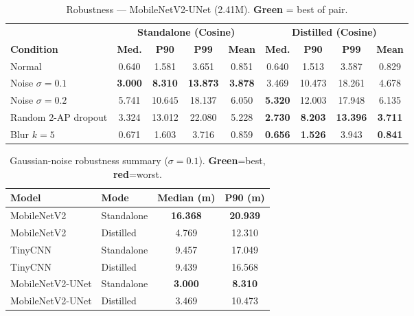 \documentclass[11pt]{article}
\newcommand{\best}[1]{\textbf{\textcolor{green!50!black}{#1}}}
\newcommand{\worst}[1]{\textbf{\textcolor{red!70!black}{#1}}}
\begin{document}
\begin{table}[h]\centering\footnotesize
\caption{Robustness --- MobileNetV2-UNet (2.41M). \best{Green} = best of pair.}
\begin{tabular}{@{}lcccc|cccc@{}}
\toprule
 & \multicolumn{4}{c|}{\textbf{Standalone (Cosine)}} & \multicolumn{4}{c}{\textbf{Distilled (Cosine)}} \\
\textbf{Condition} & \textbf{Med.} & \textbf{P90} & \textbf{P99} & \textbf{Mean} & \textbf{Med.} & \textbf{P90} & \textbf{P99} & \textbf{Mean} \\
\midrule
Normal               & 0.640 & 1.581 & 3.651 & 0.851 & 0.640 & 1.513 & 3.587 & 0.829 \\
Noise $\sigma{=}0.1$ & \best{3.000}& \best{8.310}& \best{13.873}& \best{3.878}& 3.469 & 10.473& 18.261& 4.678 \\
Noise $\sigma{=}0.2$ & 5.741 & 10.645& 18.137& 6.050 & \best{5.320}& 12.003& 17.948& 6.135 \\
Random 2-AP dropout  & 3.324 & 13.012& 22.080& 5.228 & \best{2.730}& \best{8.203}& \best{13.396}& \best{3.711} \\
Blur $k{=}5$         & 0.671 & 1.603 & 3.716 & 0.859 & \best{0.656}& \best{1.526}& 3.943 & \best{0.841} \\
\bottomrule
\end{tabular}
\end{table}

\begin{table}[h]\centering\footnotesize
\caption{Gaussian-noise robustness summary ($\sigma{=}0.1$). \best{Green}=best, \worst{red}=worst.}
\begin{tabular}{@{}llcc@{}}
\toprule
\textbf{Model} & \textbf{Mode} & \textbf{Median (m)} & \textbf{P90 (m)} \\
\midrule
MobileNetV2      & Standalone & \worst{16.368} & \worst{20.939} \\
MobileNetV2      & Distilled  & 4.769  & 12.310 \\
TinyCNN          & Standalone & 9.457  & 17.049 \\
TinyCNN          & Distilled  & 9.439  & 16.568 \\
MobileNetV2-UNet & Standalone & \best{3.000} & \best{8.310} \\
MobileNetV2-UNet & Distilled  & 3.469  & 10.473 \\
\bottomrule
\end{tabular}
\end{table}
\end{document}
